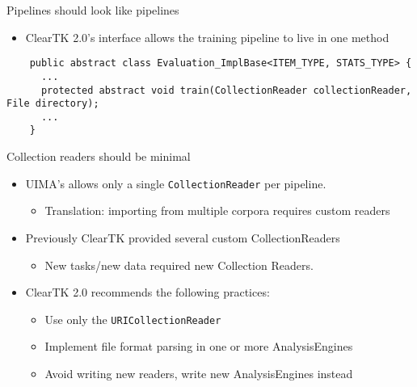 \documentclass[final]{beamer}
\newcommand{\code}[1]{\texttt{\small #1}}
\begin{document}
\begin{frame}[fragile]
\begin{columns}[t]
\begin{column}{.45\linewidth}
\begin{block}{Pipelines should look like pipelines}
    \begin{itemize}
      \item ClearTK 2.0's interface allows the training pipeline to live in one method
    \end{itemize}

    \begin{lstlisting}
    public abstract class Evaluation_ImplBase<ITEM_TYPE, STATS_TYPE> {
      ...
      protected abstract void train(CollectionReader collectionReader, File directory);
      ...
    }
    \end{lstlisting}





    \end{block}


    \begin{block}{Collection readers should be minimal}
      \begin{itemize}
              \item UIMA's allows only a single \code{CollectionReader} per pipeline.  
                      \begin{itemize}
                        \item Translation: importing from multiple corpora requires custom readers
                      \end{itemize}
              \item Previously ClearTK provided several custom CollectionReaders
                      \begin{itemize}
                        \item New tasks/new data required new Collection Readers. 
                      \end{itemize}
              \item ClearTK 2.0 recommends the following practices:
                      \begin{itemize}
                      \item Use only the \code{URICollectionReader}
                      \item Implement file format parsing in one or more AnalysisEngines
                      \item Avoid writing new readers, write new AnalysisEngines instead
                      \end{itemize}
      \end{itemize}
    \end{block}




\end{column}
\end{columns}
\end{frame}
\end{document}
